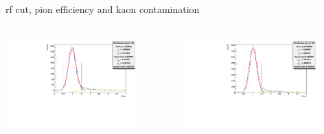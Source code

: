 \documentclass[aspectratio=169,xcolor=dvipsnames]{beamer}
\begin{document}
\begin{frame}{rf cut, pion efficiency and kaon contamination}
  \begin{columns}
    \begin{column}[T]{0.5\textwidth}
  \includegraphics[width = 0.8\textwidth]{results/pid/rftime/rftime_neg_180_pi.pdf}
\end{column}
\begin{column}[T]{0.5\textwidth}
  \includegraphics[width = 0.8\textwidth]{results/pid/rftime/rftime_pos_180_pi.pdf}
\end{column}
\end{columns}
\end{frame}
\end{document}
